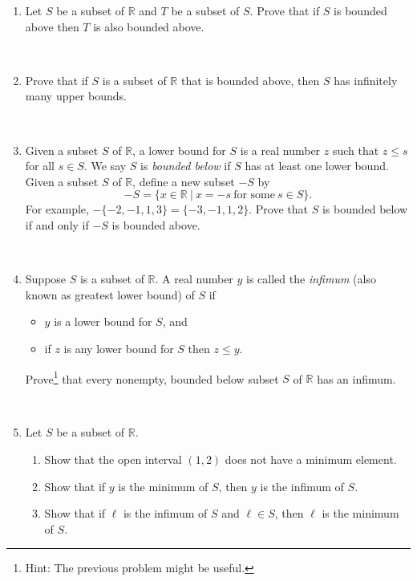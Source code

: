 \documentclass{amsart}
\def\R{\mathbb R}
\begin{document}
\begin{enumerate}
\item Let $S$ be a subset of $\R$ and $T$ be a subset of $S$. Prove that if $S$ is bounded above
then $T$ is also bounded above.

\

\item Prove that if $S$ is a subset of $\R$ that is bounded above, then $S$ has infinitely many upper bounds.

\

\item Given a subset $S$ of $\R$, a lower bound for $S$ is a real number $z$ such that $z \leq s$ for all $s \in S$.
We say $S$ is \emph{bounded below} if $S$ has at least one lower bound.
Given a subset $S$ of $\R$, define a new subset $-S$ by
\[-S = \{x \in \R \ | \ x = -s \ \text{for some} \ s \in S\}.\]
For example, $- \{-2,-1, 1, 3\} = \{-3, -1, 1, 2\}.$
Prove that $S$ is bounded below if and only if $-S$ is bounded above.

\

\item Suppose $S$ is a subset of $\R$. A real number $y$ is called the \emph{infimum} (also known as greatest
lower bound) of $S$ if
\begin{itemize}
\item $y$ is a lower bound for $S$, and
\item if $z$ is any lower bound for $S$ then $z \leq y$.
\end{itemize}
Prove\footnote{Hint: The previous problem might be useful.} that every nonempty, bounded below subset $S$ of $\R$ has an infimum.

\

\item Let $S$ be a subset of $\R$.
\begin{enumerate}
\item Show that the open interval $(1,2)$ does not have a minimum element.
\item Show that if $y$ is the minimum of $S$, then $y$ is the infimum of $S$.
\item Show that if $\ell$ is the infimum of $S$ and $\ell \in S$, then $\ell$ is the minimum of $S$.
\end{enumerate}



\end{enumerate}
\end{document}
